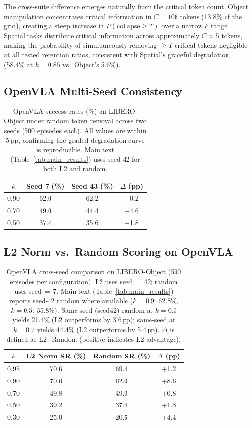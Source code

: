 The cross-suite difference emerges naturally from the critical token count. Object manipulation concentrates critical information in $C{=}106$ tokens (13.8\% of the grid), creating a steep increase in $P(\text{collapse} \geq T)$ over a narrow $k$ range. Spatial tasks distribute critical information across approximately $C \approx 5$ tokens, making the probability of simultaneously removing $\geq T$ critical tokens negligible at all tested retention ratios, consistent with Spatial's graceful degradation (58.4\% at $k{=}0.85$ vs.\ Object's 5.6\%).

\subsection{OpenVLA Multi-Seed Consistency}
\label{app:openvla_multiseed}

\begin{table}[ht]
\centering
\small
\caption{OpenVLA success rates (\%) on LIBERO-Object under random token removal across two seeds (500 episodes each). All values are within 5\,pp, confirming the graded degradation curve is reproducible. Main text (Table~\ref{tab:main_results}) uses seed 42 for both L2 and random.}
\label{tab:openvla_multiseed}
\begin{tabular}{cccc}
\toprule
$k$ & Seed 7 (\%) & Seed 43 (\%) & $\Delta$ (pp) \\
\midrule
0.90 & 62.0 & 62.2 & $+$0.2 \\
0.70 & 49.0 & 44.4 & $-$4.6 \\
0.50 & 37.4 & 35.6 & $-$1.8 \\
\bottomrule
\end{tabular}
\end{table}

\subsection{L2 Norm vs.\ Random Scoring on OpenVLA}
\label{app:l2_vs_random}

\begin{table}[ht]
\centering
\small
\caption{OpenVLA cross-seed comparison on LIBERO-Object (500 episodes per configuration). L2 uses seed$\,{=}\,$42; random uses seed$\,{=}\,$7. Main text (Table~\ref{tab:main_results}) reports seed-42 random where available ($k{=}0.9$: 62.8\%, $k{=}0.5$: 35.8\%). Same-seed (seed42) random at $k{=}0.3$ yields 21.4\% (L2 outperforms by 3.6\,pp); same-seed at $k{=}0.7$ yields 44.4\% (L2 outperforms by 5.4\,pp). $\Delta$ is defined as L2$-$Random (positive indicates L2 advantage).}
\label{tab:openvla_l2_vs_random}
\begin{tabular}{cccc}
\toprule
$k$ & L2 Norm SR (\%) & Random SR (\%) & $\Delta$ (pp) \\
\midrule
0.95 & 70.6 & 69.4 & $+$1.2 \\
0.90 & 70.6 & 62.0 & $+$8.6 \\
0.70 & 49.8 & 49.0 & $+$0.8 \\
0.50 & 39.2 & 37.4 & $+$1.8 \\
0.30 & 25.0 & 20.6 & $+$4.4 \\
\bottomrule
\end{tabular}
\end{table}

